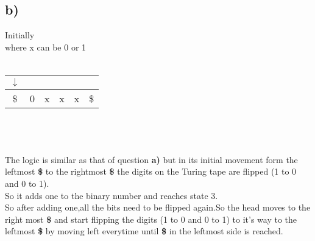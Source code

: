 \documentclass{article}
\begin{document}
\subsection*{b)}
Initially \\
where x can be 0 or 1 \\\\
\begin{tabular}{|c|c|c|c|c|c|}
     $\downarrow$\\
     \hline
     \$ & 0 & x & x & x &\$  \\
     \hline
\end{tabular}
\\\\\\
The logic is similar as that of question \textbf{a)} but in its initial movement form the leftmost \textbf{\$} to the rightmost \textbf{\$} the digits on the Turing tape are flipped (1 to 0 and 0 to 1).\\
So it adds one to the binary number and reaches state 3.\\
So after adding one,all the bits need to be flipped again.So the head moves to the right most \textbf{\$} and start flipping the digits (1 to 0 and 0 to 1) to it's way to the leftmost \textbf{\$} by moving left everytime until \textbf{\$} in the leftmost side is reached. 
\end{document}
